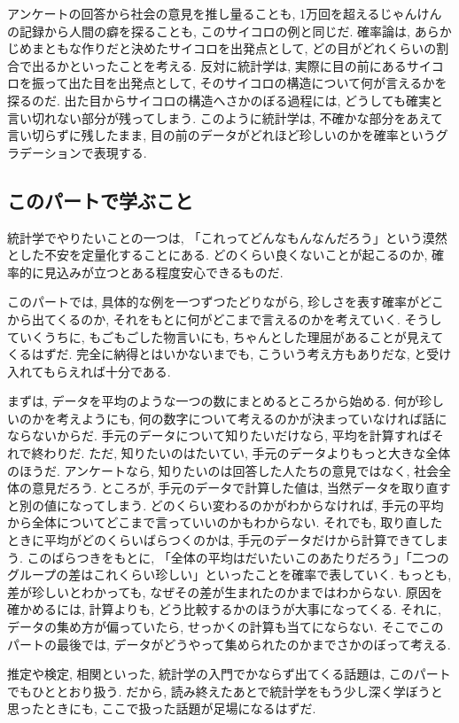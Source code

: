     アンケートの回答から社会の意見を推し量ることも, 1万回を超えるじゃんけんの記録から人間の癖を探ることも, このサイコロの例と同じだ.
    確率論は, あらかじめまともな作りだと決めたサイコロを出発点として, どの目がどれくらいの割合で出るかといったことを考える.
    反対に統計学は, 実際に目の前にあるサイコロを振って出た目を出発点として, そのサイコロの構造について何が言えるかを探るのだ.
    出た目からサイコロの構造へさかのぼる過程には, どうしても確実と言い切れない部分が残ってしまう.
    このように統計学は, 不確かな部分をあえて言い切らずに残したまま, 目の前のデータがどれほど珍しいのかを確率というグラデーションで表現する.

  \subsection{このパートで学ぶこと}

    統計学でやりたいことの一つは, 「これってどんなもんなんだろう」という漠然とした不安を定量化することにある.
    どのくらい良くないことが起こるのか, 確率的に見込みが立つとある程度安心できるものだ.

    このパートでは, 具体的な例を一つずつたどりながら, 珍しさを表す確率がどこから出てくるのか, それをもとに何がどこまで言えるのかを考えていく.
    そうしていくうちに, もごもごした物言いにも, ちゃんとした理屈があることが見えてくるはずだ.
    完全に納得とはいかないまでも, こういう考え方もありだな, と受け入れてもらえれば十分である.

    まずは, データを平均のような一つの数にまとめるところから始める.
    何が珍しいのかを考えようにも, 何の数字について考えるのかが決まっていなければ話にならないからだ.
    手元のデータについて知りたいだけなら, 平均を計算すればそれで終わりだ.
    ただ, 知りたいのはたいてい, 手元のデータよりもっと大きな全体のほうだ.
    アンケートなら, 知りたいのは回答した人たちの意見ではなく, 社会全体の意見だろう.
    ところが, 手元のデータで計算した値は, 当然データを取り直すと別の値になってしまう.
    どのくらい変わるのかがわからなければ, 手元の平均から全体についてどこまで言っていいのかもわからない.
    それでも, 取り直したときに平均がどのくらいばらつくのかは, 手元のデータだけから計算できてしまう.
    このばらつきをもとに, 「全体の平均はだいたいこのあたりだろう」「二つのグループの差はこれくらい珍しい」といったことを確率で表していく.
    もっとも, 差が珍しいとわかっても, なぜその差が生まれたのかまではわからない.
    原因を確かめるには, 計算よりも, どう比較するかのほうが大事になってくる.
    それに, データの集め方が偏っていたら, せっかくの計算も当てにならない.
    そこでこのパートの最後では, データがどうやって集められたのかまでさかのぼって考える.

    推定や検定, 相関といった, 統計学の入門でかならず出てくる話題は, このパートでもひととおり扱う.
    だから, 読み終えたあとで統計学をもう少し深く学ぼうと思ったときにも, ここで扱った話題が足場になるはずだ.
